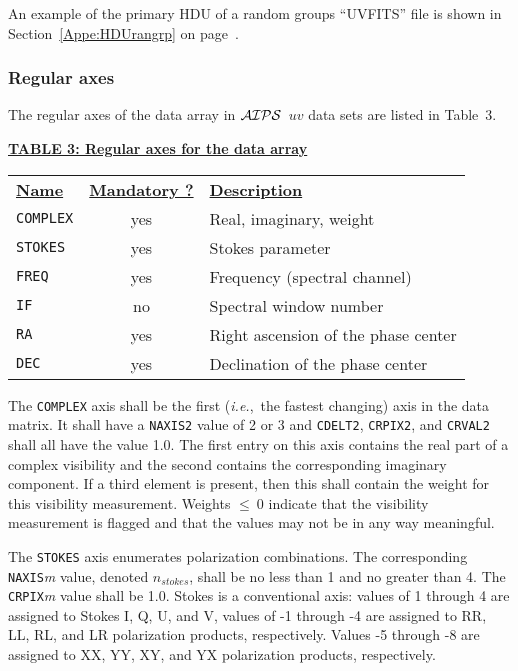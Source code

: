 \documentclass[twoside]{article}
\newcommand{\AIPS}{{$\cal AIPS\/$}}
\newcommand{\ie}{{\it i.e.},}
\newcommand{\nstokes}{$n_{stokes}$}
\begin{document}
An example of the primary HDU of a random groups ``UVFITS'' file is
shown in Section~\ref{Appe:HDUrangrp} on page~\pageref{Appe:HDUrangrp}.

\subsubsection{Regular axes}
\label{RGregax}

The regular axes of the data array in \AIPS\ $uv$ data sets are listed
in Table~3.

\begin{center}
\underline{\bf{TABLE 3: Regular axes for the data array}}\\
\begin{tabular}{lcl}
\noalign{\vspace{2pt}} \label{ta:UVaxes}
\underline{{\bf Name\vphantom{y}}} & \underline{\bf{Mandatory ?}} &
    \underline{\bf{Description}} \\
\noalign{\vspace{2pt}}
{\tt COMPLEX} & yes & Real, imaginary, weight \\
{\tt STOKES}  & yes & Stokes parameter \\
{\tt FREQ}    & yes & Frequency (spectral channel) \\
{\tt IF  }    & no  & Spectral window number \\
{\tt RA}      & yes & Right ascension of the phase center \\
{\tt DEC}     & yes & Declination of the phase center
\end{tabular}
\end{center}

The {\tt COMPLEX} axis shall be the first (\ie\ the fastest changing)
axis in the data matrix.  It shall have a {\tt NAXIS2} value of 2 or 3
and {\tt CDELT2}, {\tt CRPIX2}, and {\tt CRVAL2} shall all have the
value 1.0.  The first entry on this axis contains the real part of a
complex visibility and the second contains the corresponding imaginary
component.  If a third element is present, then this shall contain the
weight for this visibility measurement.  Weights $\leq\ 0$ indicate
that the visibility measurement is flagged and that the values may not
be in any way meaningful.

The {\tt STOKES} axis enumerates polarization combinations.  The
corresponding {\tt NAXIS}{\it m} value, denoted \nstokes, shall be no
less than 1 and no greater than 4.  The {\tt CRPIX}{\it m} value shall
be 1.0.  Stokes is a conventional axis: values of 1 through 4 are
assigned to Stokes I, Q, U, and V, values of -1 through -4 are
assigned to RR, LL, RL, and LR polarization products, respectively.
Values -5 through -8 are assigned to XX, YY, XY, and YX polarization
products, respectively.
\end{document}
